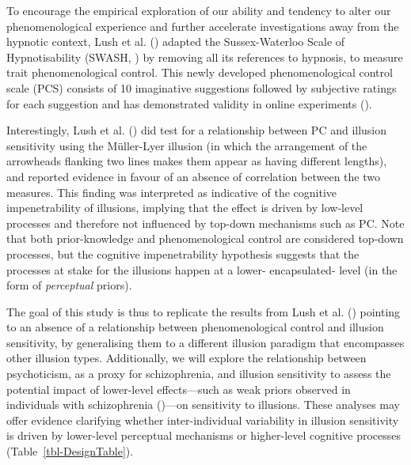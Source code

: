 \documentclass[
  man,
  floatsintext,
  longtable,
  nolmodern,
  notxfonts,
  notimes,
  colorlinks=true,linkcolor=blue,citecolor=blue,urlcolor=blue]{apa7}
\begin{document}
To encourage the empirical exploration of our ability and tendency to
alter our phenomenological experience and further accelerate
investigations away from the hypnotic context, Lush et al.
() adapted the Sussex-Waterloo Scale of
Hypnotisability (SWASH, ) by
removing all its references to hypnosis, to measure trait
phenomenological control. This newly developed phenomenological control
scale (PCS) consists of 10 imaginative suggestions followed by
subjective ratings for each suggestion and has demonstrated validity in
online experiments ().

Interestingly, Lush et al. () did test for
a relationship between PC and illusion sensitivity using the Müller-Lyer
illusion (in which the arrangement of the arrowheads flanking two lines
makes them appear as having different lengths), and reported evidence in
favour of an absence of correlation between the two measures. This
finding was interpreted as indicative of the cognitive impenetrability
of illusions, implying that the effect is driven by low-level processes
and therefore not influenced by top-down mechanisms such as PC. Note
that both prior-knowledge and phenomenological control are considered
top-down processes, but the cognitive impenetrability hypothesis
suggests that the processes at stake for the illusions happen at a
lower- encapsulated- level (in the form of \emph{perceptual} priors).

The goal of this study is thus to replicate the results from Lush et al.
() pointing to an absence of a relationship
between phenomenological control and illusion sensitivity, by
generalising them to a different illusion paradigm that encompasses
other illusion types. Additionally, we will explore the relationship
between psychoticism, as a proxy for schizophrenia, and illusion
sensitivity to assess the potential impact of lower-level effects---such
as weak priors observed in individuals with schizophrenia
()---on sensitivity to
illusions.\textbf{ }These analyses may offer evidence clarifying whether
inter-individual variability in illusion sensitivity is driven by
lower-level perceptual mechanisms or higher-level cognitive processes
(Table~\ref{tbl-DesignTable}).
\end{document}
